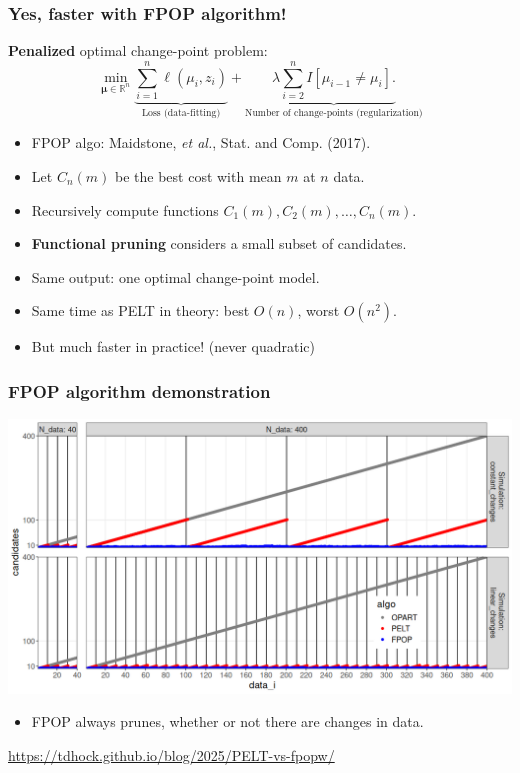 \documentclass{beamer}
\newcommand{\RR}{\mathbb R}
\begin{document}
\begin{frame}
  \frametitle{Yes, faster with FPOP algorithm!}
  \textbf{Penalized} optimal change-point problem:
$$
\min_{
  \mathbf \mu\in\RR^{n}
}
\underbrace{\sum_{i=1}^{n} \ell( \mu_i,  z_i)}_{\text{Loss (data-fitting)}} + \underbrace{\lambda\sum_{i=2}^n I[\mu_{i-1}\neq \mu_i].}_{\text{Number of change-points (regularization)}}
$$
\begin{itemize}
\item FPOP algo: Maidstone, \emph{et al.}, Stat. and Comp. (2017).
\item Let $C_n(m)$ be the best cost with mean $m$ at $n$ data.
\item Recursively compute functions $C_{1}(m), C_2(m),\dots, C_{n}(m)$.
\item \textbf{Functional pruning} considers a small subset of candidates.
\item Same output: one optimal change-point model.
\item Same time as PELT in theory: best $O(n)$, worst $O(n^2)$.
\item But much faster in practice! (never quadratic)
\end{itemize}
\end{frame}



\begin{frame}
  \frametitle{FPOP algorithm demonstration}
  \includegraphics[width=\textwidth]{fpop-prune-1.png}

  \begin{itemize}
  \item FPOP always prunes, whether or not there are changes in data.
  \end{itemize}

  \url{https://tdhock.github.io/blog/2025/PELT-vs-fpopw/}
\end{frame}
 
\end{document}
